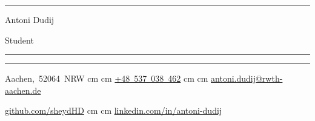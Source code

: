 \documentclass[11pt, letterpaper]{article}
\newenvironment{header}{
    \setlength{\topsep}{0pt}\par\kern\topsep\centering\linespread{0.3}
}{
    \par\kern\topsep
} %
\let\hrefWithoutArrow\href
\renewcommand{\href}[2]{\hrefWithoutArrow{#1}{\ifthenelse{\equal{#2}{}}{ }{#2 }\raisebox{.15ex}{\footnotesize \faExternalLink*}}}
\begin{document}
    \newcommand{\AND}{\unskip
        \cleaders\copy\ANDbox\hskip\wd\ANDbox
        \ignorespaces
    }
    \newsavebox\ANDbox
    \sbox\ANDbox{}

    \begin{header}
        \hrule
        \vspace{0.5cm}
        {\fontsize{30 pt}{30 pt}\selectfont Antoni Dudij}

        \vspace{0.2cm}
        {\fontsize{18 pt}{18pt}\selectfont Student}

        \vspace{0.4cm} %
        \normalsize
        {\color{black}\rule{\textwidth}{0.1pt}}
        \vspace{0.035cm} %
        {\color{black}\rule{\textwidth}{0.1pt}}

        \vspace{0.4cm}

        \mbox{{\color{black}\footnotesize\faMapMarker*}\hspace*{0.13cm}Aachen, 52064 NRW}  cm \textbullet {} cm
        \mbox{\hrefWithoutArrow{tel:+48-537-038-462}{\color{black}{\footnotesize\faPhone*}\hspace*{0.13cm}+48 537 038 462}}  cm \textbullet {} cm
        \mbox{\hrefWithoutArrow{mailto:antoni.dudij@rwth-aachen.de}{\color{black}{\footnotesize\faEnvelope[regular]}\hspace*{0.13cm}antoni.dudij@rwth-aachen.de}}

        \vspace{0.3cm}
        
        \mbox{\hrefWithoutArrow{https://github.com/sheydHD}{\color{black}{\footnotesize\faGithub}\hspace*{0.13cm}github.com/sheydHD}}  cm \textbullet {} cm
        \mbox{\hrefWithoutArrow{https://www.linkedin.com/in/antoni-dudij-268605304/}{\color{black}{\footnotesize\faLinkedin}\hspace*{0.13cm}linkedin.com/in/antoni-dudij}}
    \end{header}

    \vspace{0.25 cm}


    
    
    
    
    
    
    
    
\end{document}
